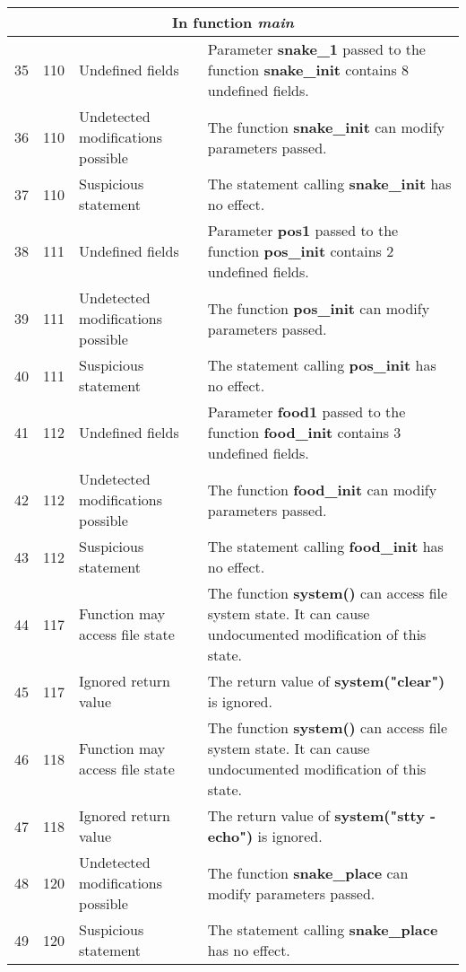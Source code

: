 \documentclass[]{article}
\begin{document}
\begin{longtable}{ |p{0.5cm}|p{0.75cm}|p{3cm}|p{9cm}|  }
 		\hline 
	 	\multicolumn{4}{|c|}{\textbf{In function \textit{main}}} \\
		\hline 
		35 & 110 & Undefined fields & Parameter \textbf{snake\_1} passed to the function \textbf{snake\_init} contains 8 undefined fields. \\
		\hline 
		36 & 110 & Undetected modifications possible & The function \textbf{snake\_init} can modify parameters passed. \\
		\hline 
		37 & 110 & Suspicious statement & The statement calling \textbf{snake\_init} has no effect. \\
		\hline 
		38 & 111 & Undefined fields & Parameter \textbf{pos1} passed to the function \textbf{pos\_init} contains 2 undefined fields. \\
		\hline 
		39 & 111 & Undetected modifications possible & The function \textbf{pos\_init} can modify parameters passed. \\
		\hline 
		40 & 111 & Suspicious statement & The statement calling \textbf{pos\_init} has no effect. \\
		\hline 
		41 & 112 & Undefined fields & Parameter \textbf{food1} passed to the function \textbf{food\_init} contains 3 undefined fields. \\
		\hline 
		42 & 112 & Undetected modifications possible & The function \textbf{food\_init} can modify parameters passed. \\
		\hline 
		43 & 112 & Suspicious statement & The statement calling \textbf{food\_init} has no effect. \\
		\hline 
		44 & 117 & Function may access file state & The function \textbf{system()} can access file system state. It can cause undocumented modification of this state. \\
		\hline 
		45 & 117 & Ignored return value & The return value of \textbf{system("clear")} is ignored. \\
		\hline 
		46 & 118 & Function may access file state & The function \textbf{system()} can access file system state. It can cause undocumented modification of this state. \\
		\hline 
		47 & 118 & Ignored return value & The return value of \textbf{system("stty -echo")} is ignored. \\
		\hline 
		48 & 120 & Undetected modifications possible & The function \textbf{snake\_place} can modify parameters passed. \\
		\hline 
		49 & 120 & Suspicious statement & The statement calling \textbf{snake\_place} has no effect. \\

\end{longtable}
\end{document}
